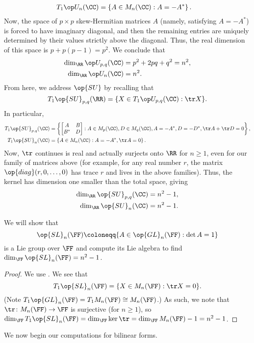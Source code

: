 \documentclass[../notes.tex]{subfiles}
\begin{document}
\begin{listalph}
\begin{align*}
		T_1\op U_n(\CC) &= \left\{A\in M_n(\CC):A=-A^*\right\}.
	\end{align*}
	Now, the space of $p\times p$ skew-Hermitian matrices $A$ (namely, satisfying $A=-A^*$) is forced to have imaginary diagonal, and then the remaining entries are uniquely determined by their values strictly above the diagonal. Thus, the real dimension of this space is $p+p(p-1)=p^2$. We conclude that
	\begin{align*}
		\dim_\RR\op U_{p,q}(\CC) &= p^2+2pq+q^2=n^2, \\
		\dim_\RR\op U_n(\CC) &= n^2.
	\end{align*}
	From here, we address $\op{SU}$ by recalling that
	\[T_1\op{SU}_{p,q}(\RR)=\{X\in T_1\op U_{p,q}(\CC):\tr X\}.\]
	In particular,
	\begin{align*}
		T_1\op{SU}_{p,q}(\CC) &= \left\{\begin{bmatrix}
			A & B \\ B^* & D
		\end{bmatrix}:A\in M_p(\CC),D\in M_q(\CC),A=-A^*,D=-D^*,\tr A+\tr D=0\right\}, \\
		T_1\op{SU}_n(\CC) &= \left\{A\in M_n(\CC):A=-A^*,\tr A=0\right\}.
	\end{align*}
	Now, $\tr$ continues is real and actually surjects onto $\RR$ for $n\ge1$, even for our family of matrices above (for example, for any real number $r$, the matrix $\op{diag}(r,0,\ldots,0)$ has trace $r$ and lives in the above families). Thus, the kernel has dimension one smaller than the total space, giving
	\begin{align*}
		\dim_\RR\op{SU}_{p,q}(\CC) &= n^2-1, \\
		\dim_\RR\op{SU}_n(\CC) &= n^2-1.
	\end{align*}
\end{listalph}
\begin{example} \label{ex:sl}
	We will show that
	\[\op{SL}_n(\FF)\coloneqq\{A\in\op{GL}_n(\FF):\det A=1\}\]
	is a Lie group over $\FF$ and compute its Lie algebra to find $\dim_\FF\op{SL}_n(\FF)=n^2-1$.
\end{example}
\begin{proof}
	We use . We see that
	\[{T_1\op{SL}_n(\FF)=\{X\in M_n(\FF):\tr X=0\}}.\]
	(Note $T_1\op{GL}_n(\FF)=T_1M_n(\FF)\cong M_n(\FF)$.) As such, we note that $\tr\colon M_n(\FF)\to\FF$ is surjective (for $n\ge1$), so $\dim_\FF T_1\op{SL}_n(\FF)=\dim_\FF\ker\tr=\dim_\FF M_n(\FF)-1=n^2-1$.
\end{proof}
We now begin our computations for bilinear forms.
\end{document}
